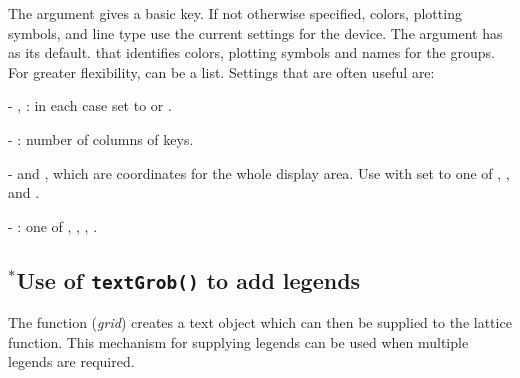 The argument  gives a basic key. If not otherwise
specified, colors, plotting symbols, and line type use the current
settings for the device.  The argument  has
 as its default. that identifies
colors, plotting symbols and names for the groups. For greater
flexibility,  can be a list.  Settings that are often
useful are:
\begin{itemizz}
\item[-] , : in each case set to 
or .
\item[-] : number of columns of keys.
\item[-]  and , which are coordinates for
  the whole display area.  Use with  set
  to one of ,
  ,  and .
\item[-] : one of , ,
, .
\end{itemizz}

\subsection*{$^*$Use of \texttt{textGrob()} to add legends}
The function  (\textit{grid}) creates a text object
which can then be supplied to the lattice function. This
mechanism for supplying legends can be used when multiple legends are
required.

